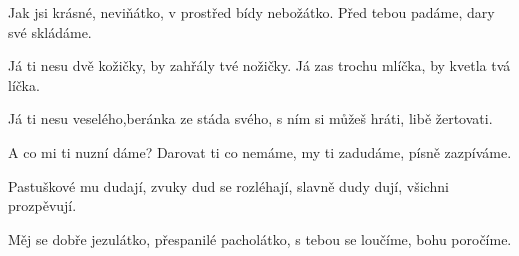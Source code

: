 \vskip-5mm
\IncludeLilypond

Jak jsi krásné, neviňátko, v prostřed bídy nebožátko.
Před tebou padáme, dary své skládáme.

Já ti nesu dvě kožičky, by zahřály tvé nožičky.
Já zas trochu mlíčka, by kvetla tvá líčka.

Já ti nesu veselého,beránka ze stáda svého,
s ním si můžeš hráti, libě žertovati.

A co mi ti nuzní dáme? Darovat ti co nemáme,
my ti zadudáme, písně zazpíváme.

Pastuškové mu dudají, zvuky dud se rozléhají,
slavně dudy dují, všichni prozpěvují.

Měj se dobře jezulátko, přespanilé pacholátko,
s tebou se loučíme, bohu poročíme.
